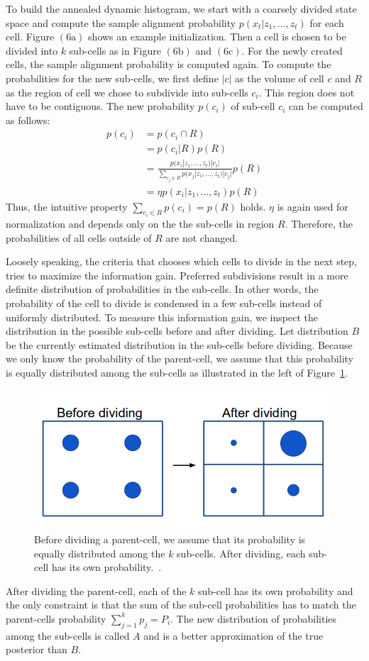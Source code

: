 \documentclass[twoside,a4paper,article]{combine}
\begin{document}
To build the annealed dynamic histogram, we start with a coarsely
divided state space and compute the sample alignment probability
$p(x_t|z_1,...,z_t)$ for each cell. Figure $(6\mbox{a})$ shows an
example initialization. Then a cell is chosen to be divided into $k$
sub-cells as in Figure $(6\mbox{b})$ and $(6\mbox{c})$. For
the newly created cells, the sample alignment probability is computed
again. To compute the probabilities for the new sub-cells, we first
define $|c|$ as the volume of cell $c$ and $R$ as the region of cell
we chose to subdivide into sub-cells $c_i$. This region does not have
to be contiguous. The new probability $p(c_i)$ of sub-cell $c_i$ can be
computed as follows:
\begin{align}
p(c_i)
&=p(c_i\cap R)\nonumber\\
&=p(c_i|R)p(R)\nonumber\\
&=\frac{p(x_i|z_1,...,z_t)|c_i|}{\sum_{c_j\in
    R}p(x_j|z_1,...,z_t)|c_{j}|}p(R)\nonumber\\
&=\eta p(x_i|z_1,...,z_t)p(R)
\end{align}
Thus, the intuitive property $\sum_{c_i\in R}p(c_i)=p(R)$
holds. $\eta$ is again used for normalization and depends only on the
the sub-cells in region $R$. Therefore, the probabilities of all cells
outside of $R$ are not changed.

Loosely speaking, the criteria that chooses which cells to divide in
the next step, tries to maximize the information gain. Preferred
subdivisions result in a more definite distribution of probabilities
in the sub-cells. In other words, the probability of the cell to divide
is condensed in a few sub-cells instead of uniformly distributed. 
To measure this information gain, we inspect the distribution in the
possible sub-cells before and after dividing. Let distribution $B$ be the
currently estimated distribution in the sub-cells before
dividing. Because we only know the probability of the parent-cell, we
assume that this probability is equally distributed among the sub-cells
as illustrated in the left of Figure~\ref{fig:adh-criteria}.
\begin{figure}
  \center
  \includegraphics[width=0.55\linewidth]{devision-criteria}
  \caption{Before dividing a parent-cell, we assume that its
    probability is equally distributed among the $k$ sub-cells. After
    dividing, each sub-cell has its own probability.~\cite{paper}.}
  \label{fig:adh-criteria}
\end{figure}
After dividing the parent-cell, each of the $k$ sub-cell has its own
probability and the only constraint is that the sum of the sub-cell
probabilities has to match the parent-cells probability $\sum_{j=1}^k p_j=P_i$. The new
distribution of probabilities among the sub-cells is called $A$ and is
a better approximation of the true posterior than $B$.
\end{document}
